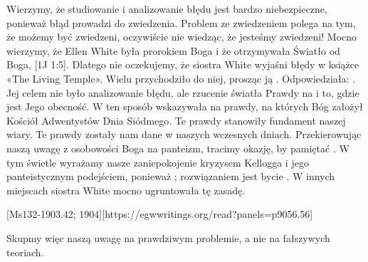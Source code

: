 Wierzymy, że studiowanie i analizowanie błędu jest bardzo niebezpieczne, ponieważ błąd prowadzi do zwiedzenia. Problem ze zwiedzeniem polega na tym, że możemy być zwiedzeni, oczywiście nie wiedząc, że jesteśmy zwiedzeni! Mocno wierzymy, że Ellen White była prorokiem Boga i że otrzymywała Światło od Boga, [1J 1:5]. Dlatego nie oczekujemy, że siostra White wyjaśni błędy w książce «The Living Temple». Wielu przychodziło do niej, prosząc ją . Odpowiedziała: . Jej celem nie było analizowanie błędu, ale rzucenie światła Prawdy na  i to, gdzie jest Jego obecność. W ten sposób wskazywała na prawdy, na których Bóg założył Kościół Adwentystów Dnia Siódmego. Te prawdy stanowiły fundament naszej wiary. Te prawdy zostały nam dane w naszych wczesnych dniach. Przekierowując naszą uwagę z osobowości Boga na panteizm, tracimy okazję, by pamiętać . W tym świetle wyrażamy nasze zaniepokojenie kryzysem Kellogga i jego panteistycznym podejściem, ponieważ ; rozwiązaniem jest bycie . W innych miejscach siostra White mocno ugruntowała tę zasadę.

[Ms132-1903.42; 1904][https://egwwritings.org/read?panels=p9056.56]

Skupmy więc naszą uwagę na prawdziwym problemie, a nie na fałszywych teoriach.


